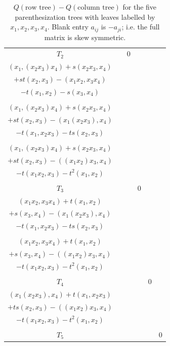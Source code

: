 \documentclass[11pt]{amsart}
\theoremstyle{definition}
\begin{document}
\begin{table}
{{\begin{tabular}{|c|c|c|c|c|c|}
    
    \hline
    $T_2$ & & 0 & \makecell{ \hspace{2pt} \\ $(x_1, (x_2 x_3)x_4) + s(x_2 x_3, x_4) $ \\ $ +st(x_2, x_3)- (x_1 x_2, x_3 x_4) $ \\ $ - t(x_1, x_2) - s(x_3, x_4)$ \\ \hspace{2pt} } & \makecell{ \hspace{2pt} \\ $(x_1, (x_2 x_3)x_4) + s(x_2 x_3, x_4) $ \\ $ +st(x_2, x_3)  - (x_1(x_2 x_3), x_4) $ \\ $ - t(x_1, x_2 x_3) - ts(x_2 , x_3)$ \\ \hspace{2pt} } & \makecell{ \hspace{2pt} \\ $(x_1, (x_2 x_3)x_4) + s(x_2 x_3, x_4) $ \\ $ +st(x_2, x_3)  -  ((x_1 x_2) x_3, x_4) $ \\ $ - t (x_1 x_2, x_3) - t^2 (x_1, x_2)$ \\ \hspace{2pt} } \\
    \hline
    $T_3$ & & & 0  & \makecell{ \hspace{2pt} \\ $(x_1 x_2, x_3 x_4) + t(x_1, x_2) $ \\ $ + s(x_3, x_4) - (x_1(x_2 x_3), x_4) $ \\ $ -t(x_1, x_2 x_3) - ts(x_2 , x_3)$ \\ \hspace{2pt} } & \makecell{ \hspace{2pt} \\ $ (x_1 x_2, x_3 x_4) + t(x_1, x_2)  $ \\ $ + s(x_3, x_4) - ((x_1 x_2) x_3, x_4) $ \\ $ - t (x_1 x_2, x_3) - t^2 (x_1, x_2) $ \\ \hspace{2pt} } \\
    \hline
    $T_4$ & & & & 0 & \makecell{ \hspace{2pt} \\ $(x_1(x_2 x_3), x_4) + t(x_1, x_2 x_3) $ \\ $ + ts(x_2 , x_3) - ((x_1 x_2) x_3, x_4) $ \\ $ - t (x_1 x_2, x_3) - t^2 (x_1, x_2)$ \\ \hspace{2pt} } \\
    \hline
    $T_5$ & & & & & 0 \\
    \hline
        \end{tabular}
      }%
    }%


    \caption{$Q(\text{row tree}) - Q(\text{column tree})$ for the five parenthesization trees with leaves labelled by $x_1, x_2, x_3, x_4$. Blank entry $a_{ij}$ is $-a_{ji}$; i.e. the full matrix is skew symmetric.}
    \end{table}
\end{document}

